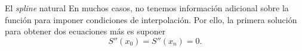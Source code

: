 \begin{frame}{El \textit{spline} natural}
  En muchos casos, no tenemos información adicional sobre la función para
  imponer condiciones de interpolación. Por ello, la primera solución para
  obtener dos ecuaciones más es suponer
  \[
    S''(x_0) = S''(x_n) = 0.
  \]
\end{frame}
